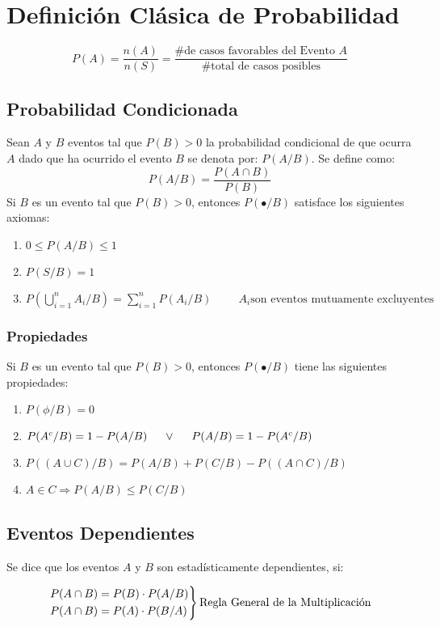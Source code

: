 \section{Definición Clásica de Probabilidad}
$$P(A)=\dfrac{n(A)}{n(S)}=\dfrac{\textrm{\# de casos favorables del Evento $A$}}{\textrm{\# total de casos posibles}}$$
\subsection{Probabilidad Condicionada}
Sean $A$ y $B$ eventos tal que $P(B)>0$ la probabilidad condicional de que ocurra $A$ dado que ha ocurrido el evento $B$ se denota por: $P(A/B)$. Se define como:
$$P(A/B)=\dfrac{P(A\cap B)}{P(B)}$$
Si $B$ es un evento tal que $P(B)>0$, entonces $P(\bullet/B)$ satisface los siguientes axiomas:
\begin{enumerate}[label=(\roman*)]
\item $0\leq P(A/B)\leq 1$
\item $P(S/B)=1$
\item $P\left( \bigcup\limits_{i=1}^{n} A_i/B\right)=
\displaystyle\sum_{i=1}^{n}P(A_i/B) \hspace{1cm}A_i \textrm{son eventos mutuamente excluyentes}$
\end{enumerate}
\subsubsection{Propiedades}
Si $B$ es un evento tal que $P(B)>0$, entonces $P(\bullet/B)$ tiene las siguientes propiedades:
\begin{enumerate}
\item $P(\phi/B)=0$
\item $P(A^c/B)=1-P(A/B)\hspace{0.5cm} \vee \hspace{0.5cm} P(A/B)=1-P(A^c/B) $
\item $P((A\cup C)/B)=P(A/B)+P(C/B)-P((A\cap C)/B)$
\item $A\in C \Rightarrow P(A/B)\leq P(C/B)$
\end{enumerate}
\subsection{Eventos Dependientes}
Se dice que los eventos $A$ y $B$ son estadísticamente dependientes, si:

\begin{equation*}
\begin{rcases}
  P(A\cap B)=P(B)\cdot P(A/B)\\
  P(A\cap B)=P(A)\cdot P(B/A)
\end{rcases}
\text{Regla General de la Multiplicación}
\end{equation*}
